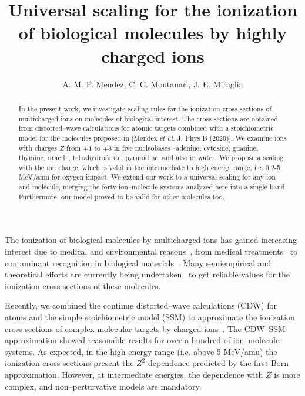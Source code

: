 \documentclass[10pt,showpacs,showkeys,twocolumn]{revtex4}
\begin{document}
\title[Universal scaling for the ionization of biological molecules]{
Universal scaling for the ionization of biological molecules by highly charged ions}
\author{A. M. P. Mendez, C. C. Montanari, J. E. Miraglia}

\date{}%

\begin{abstract}
In the present work, we investigate scaling rules for the ionization cross sections of multicharged ions on molecules of biological interest. The cross sections are obtained from distorted--wave calculations for atomic targets combined with a stoichiometric model for the molecules proposed in [Mendez \textit{et al.} J. Phys B (2020)]. We examine ions with charges $Z$ from $+1$ to $+8$ in five nucleobases --adenine, cytosine, guanine, thymine, uracil--, tetrahydrofuran, pyrimidine, and also in water. We propose a scaling with the ion charge, which is valid in the intermediate to high energy range, i.e. 0.2-5 MeV/amu for oxygen impact. We extend our work to a universal scaling for any ion and molecule, merging the forty ion--molecule systems analyzed here into a single band. Furthermore, our model proved to be valid for other molecules too.  
\end{abstract}


\maketitle


The ionization of biological molecules by multicharged ions has gained increasing interest due to medical and environmental reasons~\cite{PhysMed}, from medical treatments~\cite{Mohamad2017,Solov2009,Denifl2011} to contaminant recognition in biological materials~\cite{water,ferrazdias}. Many semiempirical \citep{vera_prl2013} and theoretical efforts are currently being undertaken~\cite{MendezJPB20,Quinto20,ludde2019,ludde2018,ludde2016,Champion2012} to get reliable values for the ionization cross sections of these molecules. 

Recently, we combined the continue distorted--wave calculations (CDW) for atoms and the simple stoichiometric model (SSM) to approximate the ionization cross sections of complex molecular targets by charged ions~\cite{MendezJPB20}. The CDW--SSM approximation showed reasonable results for over a hundred of ion--molecule systems. As expected, in the high energy range (i.e. above 5 MeV/amu) the ionization cross sections  present the $Z^2$ dependence predicted by the first Born approximation. However, at intermediate energies, the dependence with $Z$ is more complex, and non--perturvative models are mandatory.  
\end{document}
